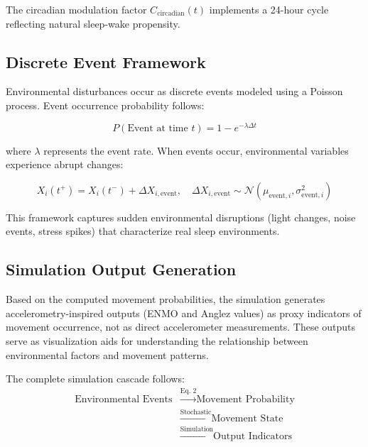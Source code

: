 \documentclass[conference]{IEEEtran}
\begin{document}
The circadian modulation factor $C_{\text{circadian}}(t)$ implements a 24-hour cycle reflecting natural sleep-wake propensity.

\subsection{Discrete Event Framework}

Environmental disturbances occur as discrete events modeled using a Poisson process. Event occurrence probability follows:

\begin{equation}
	P(\text{Event at time } t) = 1 - e^{-\lambda \Delta t}
\end{equation}

where $\lambda$ represents the event rate. When events occur, environmental variables experience abrupt changes:

\begin{equation}
	X_i(t^+) = X_i(t^-) + \Delta X_{i,\text{event}}, \quad \Delta X_{i,\text{event}} \sim \mathcal{N}(\mu_{\text{event},i}, \sigma_{\text{event},i}^2)
\end{equation}

This framework captures sudden environmental disruptions (light changes, noise events, stress spikes) that characterize real sleep environments.

\subsection{Simulation Output Generation}

Based on the computed movement probabilities, the simulation generates accelerometry-inspired outputs (ENMO and Anglez values) as proxy indicators of movement occurrence, not as direct accelerometer measurements. These outputs serve as visualization aids for understanding the relationship between environmental factors and movement patterns.

The complete simulation cascade follows:
\begin{equation}
\begin{aligned}
    \text{Environmental Events} &\xrightarrow{\text{Eq. 2}} \text{Movement Probability} \\
    &\xrightarrow{\text{Stochastic}} \text{Movement State} \\
    &\xrightarrow{\text{Simulation}} \text{Output Indicators}
\end{aligned}
\end{equation}
\end{document}
